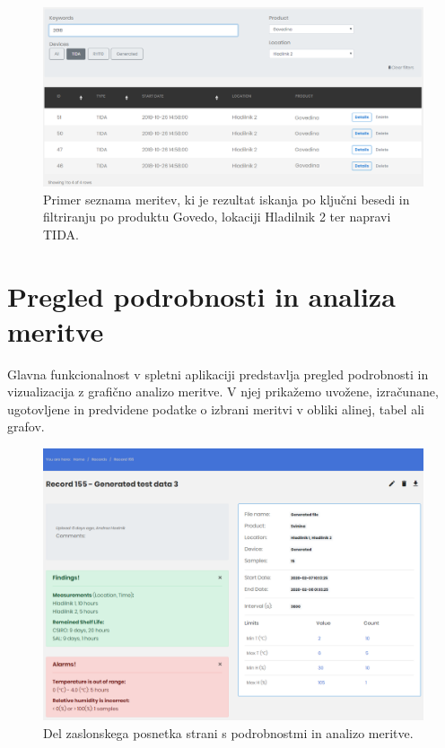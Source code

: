 \documentclass[a4paper, 12pt]{book}
\begin{document}
\begin{figure}[h]
\begin{center}
\includegraphics[width=\textwidth]{slike/records_page_filtered_1.png}
\end{center}
\caption{Primer seznama meritev, ki je rezultat iskanja po ključni besedi  in filtriranju po produktu Govedo, lokaciji Hladilnik 2 ter napravi TIDA.}
\label{ss-records-page}
\end{figure}


\section{Pregled podrobnosti in analiza meritve}

Glavna funkcionalnost v spletni aplikaciji predstavlja pregled podrobnosti in vizualizacija z grafično analizo meritve. V njej prikažemo uvožene, izračunane, ugotovljene in predvidene podatke o izbrani meritvi v obliki alinej, tabel ali grafov. 

\begin{figure}[h]
\begin{center}
\includegraphics[width=\textwidth]{slike/record_page_11.png}
\end{center}
\caption{Del zaslonskega posnetka strani s podrobnostmi in analizo meritve.}
\label{ss-record-page}
\end{figure}
\end{document}
